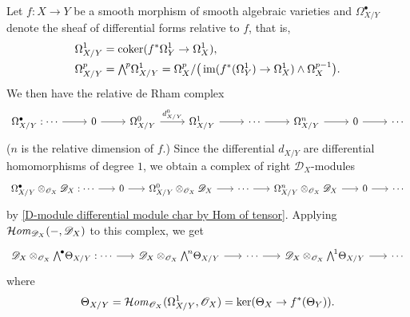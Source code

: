 Let $f:X\to Y$ be a smooth morphism of smooth algebraic varieties and $\Omega_{X/Y}^\bullet$ denote the sheaf of differential forms relative to $f$, that is,
\begin{align}
\Omega_{X/Y}^1&=\coker(f^*\Omega_Y^1\to\Omega_X^1),\label{D-module relative differential form def-1} \\
\Omega_{X/Y}^p&=\bigw^p\Omega_{X/Y}^1=\Omega_X^p/\big(\im(f^*(\Omega_Y^1)\to \Omega_X^1)\wedge \Omega_X^{p-1}\big).\label{D-module relative differential form def-2}
\end{align}
We then have the relative de Rham complex
\[\begin{tikzcd}
\Omega_{X/Y}^\bullet:\cdots\ar[r]&0\ar[r]&\Omega_{X/Y}^0\ar[r,"d^0_{X/Y}"]&\Omega_{X/Y}^1\ar[r]&\cdots\ar[r]&\Omega_{X/Y}^n\ar[r]&0\ar[r]&\cdots 
\end{tikzcd}
\]
($n$ is the relative dimension of $f$.) Since the differential $d_{X/Y}$ are differential homomorphisms of degree $1$, we obtain a complex of right $\mathscr{D}_X$-modules
\begin{equation}\label{D-module relative complex of D_X tensor Omega}
\begin{tikzcd}[column sep=6mm]
\Omega_{X/Y}^\bullet\otimes_{\mathscr{O}_X}\mathscr{D}_X:\cdots\ar[r]&0\ar[r]&\Omega_{X/Y}^0\otimes_{\mathscr{O}_X}\mathscr{D}_X\ar[r]&\cdots\ar[r]&\Omega_{X/Y}^n\otimes_{\mathscr{O}_X}\mathscr{D}_X\ar[r]&0\ar[r]&\cdots 
\end{tikzcd}
\end{equation}
by \cref{D-module differential module char by Hom of tensor}. Applying $\operatorname{\mathcal{H}\hspace*{-0.4pt}\textit{om}\hspace{0.5pt}}_{\mathscr{D}_X}(-,\mathscr{D}_X)$ to this complex, we get\
\begin{equation}\label{D-module relative complex of D_X tensor Theta}
\begin{tikzcd}[column sep=6mm]
\mathscr{D}_X\otimes_{\mathscr{O}_X}\bigw^\bullet\Theta_{X/Y}:\cdots\ar[r]&\mathscr{D}_X\otimes_{\mathscr{O}_X}\bigw^n\Theta_{X/Y}\ar[r]&\cdots\ar[r]&\mathscr{D}_X\otimes_{\mathscr{O}_X}\bigw^1\Theta_{X/Y}\ar[r]&\cdots 
\end{tikzcd}
\end{equation}
where 
\[\Theta_{X/Y}=\operatorname{\mathcal{H}\hspace*{-0.4pt}\textit{om}\hspace{0.5pt}}_{\mathscr{O}_X}(\Omega_{X/Y}^1,\mathscr{O}_X)=\operatorname{ker}(\Theta_X\to f^*(\Theta_Y)).\]

